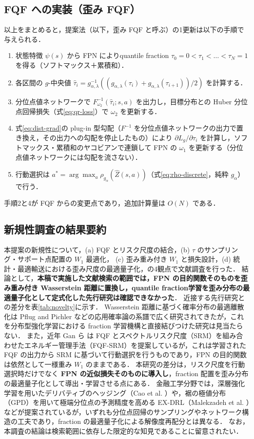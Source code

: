 \documentclass[a4paper,10pt]{jsarticle}
\theoremstyle{definition}
\newcommand{\Wone}{W_1}
\newcommand{\Finv}{F^{-1}}
\begin{document}
\subsection{FQF への実装（歪み FQF）}
\label{subsec:impl}
以上をまとめると，提案法（以下，歪み FQF と呼ぶ）の1更新は以下の手順で与えられる．
\begin{enumerate}
  \item 状態特徴 $\psi(s)$ から FPN によりquantile fraction $\tau_0=0<\tau_1<\dots<\tau_N=1$ を得る（ソフトマックス＋累積和）．
  \item 各区間の $g$-中央値 $\hat\tau_i=g_{\alpha,\lambda}^{-1}\!\left((g_{\alpha,\lambda}(\tau_i)+g_{\alpha,\lambda}(\tau_{i+1}))/2\right)$ を計算する．
  \item 分位点値ネットワークで $\Finv_{\omega_2}(\hat\tau_i;s,a)$ を出力し，目標分布との Huber 分位点回帰損失（式\eqref{eq:qr-loss}）で $\omega_2$ を更新する．
  \item 式\eqref{eq:dist-grad}の plug-in 型勾配（$\Finv$ を分位点値ネットワークの出力で置き換え，その出力への勾配を停止したもの）により $\partial L_g/\partial\tau_i$ を計算し，ソフトマックス・累積和のヤコビアンで連鎖して FPN の $\omega_1$ を更新する（分位点値ネットワークには勾配を流さない）．
  \item 行動選択は $a^*=\arg\max_a\rho_{g_\alpha}(\hat Z(s,a))$（式\eqref{eq:rho-discrete}，純粋 $g_\alpha$）で行う．
\end{enumerate}
手順2と4が FQF からの変更点であり，追加計算量は $O(N)$ である．

\subsection{新規性調査の結果要約}
本提案の新規性について，(a) FQF とリスク尺度の結合，(b) $\tau$ のサンプリング・サポート点配置の $\Wone$ 最適化，
(c) 歪み重み付き $\Wone$ と損失設計，(d) 統計・最適輸送における歪み尺度の最適量子化，の4観点で文献調査を行った．
結論として，\textbf{本稿で実施した文献検索の範囲では，FPN の目的関数そのものを歪み重み付き Wasserstein 距離に置換し，quantile fraction学習を歪み分布の最適量子化として定式化した先行研究は確認できなかった}．
近接する先行研究との差分を表\ref{tab:novelty}に示す．
Wasserstein 距離に基づく確率分布の最適離散化は Pflug and Pichler \cite{pflug2014multistage} などの応用確率論の系譜で広く研究されてきたが，これを分布型強化学習における fraction 学習機構と直接結びつけた研究は見当たらない．
また，近年 Gan ら \cite{gan2026energy} は FQF とスペクトルリスク尺度（SRM）を組み合わせたエネルギー管理手法（FQF-SRM）を提案しているが，これは学習された FQF の出力から SRM に基づいて行動選択を行うものであり，FPN の目的関数は依然として一様重み $W_1$ のままである．
本研究の差分は，リスク尺度を行動選択時だけでなく \textbf{FPN の近似損失そのものに導入し}，fraction 配置を歪み分布の最適量子化として導出・学習させる点にある．
金融工学分野では，深層強化学習を用いたデリバティブのヘッジング（Cao et al. \cite{cao2021deep,cao2023gamma}）や，裾の極値分布（GPD）を用いて極端分位点の予測精度を高める EX-DRL（Malekzadeh et al. \cite{malekzadeh2024exdrl}）などが提案されているが，いずれも分位点回帰のサンプリングやネットワーク構造の工夫であり，fraction の最適量子化による解像度再配分とは異なる．
なお，本調査の結論は検索範囲に依存した限定的な知見であることに留意されたい．
\end{document}
